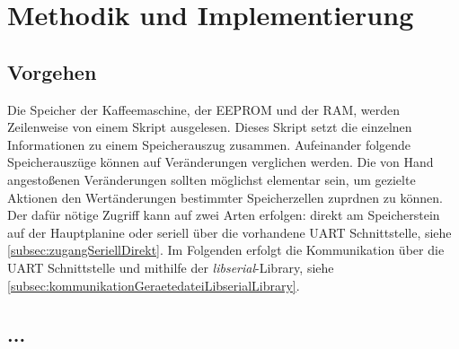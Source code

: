 \chapter{Methodik und Implementierung}

\section{Vorgehen}
Die Speicher der Kaffeemaschine, der \ac{EEPROM} und der \ac{RAM}, werden Zeilenweise von einem Skript ausgelesen.
Dieses Skript setzt die einzelnen Informationen zu einem Speicherauszug zusammen.
Aufeinander folgende Speicherauszüge können auf Veränderungen verglichen werden.
Die von Hand angestoßenen Veränderungen sollten möglichst elementar sein, um gezielte Aktionen den Wertänderungen bestimmter Speicherzellen zuprdnen zu können.
Der dafür nötige Zugriff kann auf zwei Arten erfolgen: direkt am Speicherstein auf der Hauptplanine oder seriell über die vorhandene \ac{UART} Schnittstelle, siehe \ref{subsec:zugangSeriellDirekt}.
Im Folgenden erfolgt die Kommunikation über die \ac{UART} Schnittstelle und mithilfe der \textit{libserial}-Library, siehe \ref{subsec:kommunikationGeraetedateiLibserialLibrary}.

\section{...}
